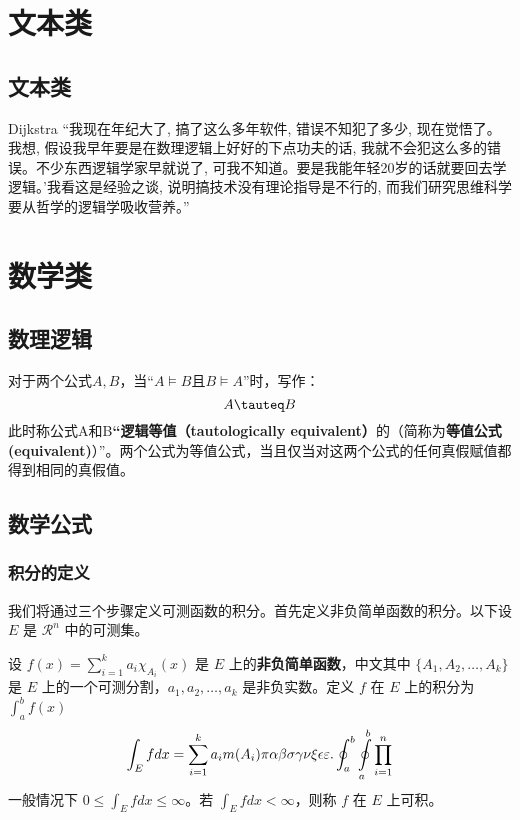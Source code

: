 \documentclass[math,code,logic,quote,code,mode=simple]{codedumpnote}
\begin{document}
	\frontmatter	%
	
	\mainmatter		%

\part{文本类}
\chapter{文本类}

\begin{pquotation}{Dijkstra}
“我现在年纪大了, 搞了这么多年软件, 错误不知犯了多少, 现在觉悟了。我想, 假设我早年要是在数理逻辑上好好的下点功夫的话, 我就不会犯这么多的错误。不少东西逻辑学家早就说了, 可我不知道。要是我能年轻20岁的话就要回去学逻辑。’我看这是经验之谈, 说明搞技术没有理论指导是不行的, 而我们研究思维科学要从哲学的逻辑学吸收营养。”
\end{pquotation}

\part{数学类}
\chapter{数理逻辑}

对于两个公式$A,B$，当“$A \vDash B$且$B \vDash A$”时，写作：
$$
	A \tauteq B
$$
此时称公式A和B\textbf{“逻辑等值（tautologically equivalent）}的（简称为\textbf{等值公式(equivalent)}）”。两个公式为等值公式，当且仅当对这两个公式的任何真假赋值都得到相同的真假值。



\chapter{数学公式}
\section{积分的定义}

我们将通过三个步骤定义可测函数的积分。首先定义非负简单函数的积分。以下设 $E$ 是 $\mathcal{R}^n$ 中的可测集。

\begin{definition}[可积性] \label{def:int} 
设 $ f(x)=\sum\limits_{i=1}^{k} a_i \chi_{A_i}(x)$ 是 $E$ 上的\textbf{非负简单函数}，中文其中 $\{A_1,A_2,\ldots,A_k\}$ 是 $E$ 上的一个可测分割，$a_1,a_2,\ldots,a_k$ 是非负实数。定义 $f$ 在 $E$ 上的积分为 $\int_{a}^b f(x)$
\begin{equation}
   \label{inter}
   \int_{E} f dx = \sum_{i=1}^k a_i m(A_i) \pi \alpha\beta\sigma\gamma\nu\xi\epsilon\varepsilon. \oint_{a}^b\ointop_{a}^b\prod_{i=1}^n
\end{equation}
一般情况下 $0 \leq \int_{E} f dx \leq \infty$。若 $\int_{E} f dx < \infty$，则称 $f$ 在 $E$ 上可积。
\end{definition}
\end{document}

